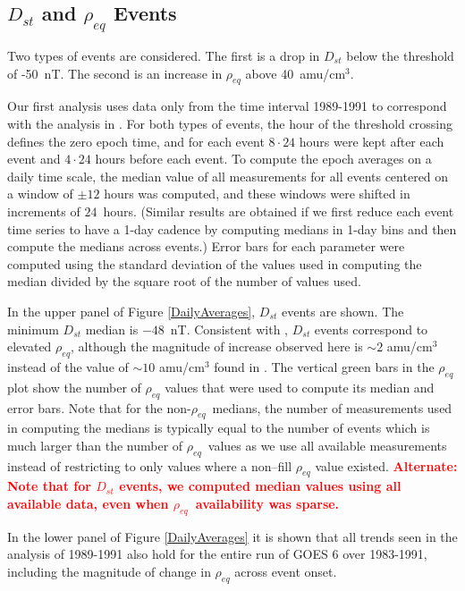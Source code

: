 \documentclass[10pt,twocolumn]{article}
\newcommand{\vinote}[1]{\textcolor{red}{\textbf{#1}}} %
\newcommand{\req}{\ensuremath{\rho_{eq}}}
\newcommand{\inote}[1]{\textcolor{blue}{\textbf{#1}}} %
\def\note#1\par{\textcolor{blue}{\textbf{#1}}\\}
\begin{document}
\subsection{$D_{st}$ and $\rho_{eq}$ Events}

Two types of events are considered. The first is a drop in $D_{st}$ below the threshold of -50~nT.  The second is an increase in $\rho_{eq}$ above 40~amu/cm$^3$.

Our first analysis uses data only from the time interval 1989-1991 to correspond with the analysis in \cite{Takahashi2010}. For both types of events, the hour of the threshold crossing defines the zero epoch time, and for each event $8\cdot24$ hours were kept after each event and $4\cdot24$ hours before each event.  To compute the epoch averages on a daily time scale, the median value of all measurements for all events centered on a window of $\pm 12$ hours was computed, and these windows were shifted in increments of $24$~hours. (Similar results are obtained if we first reduce each event time series to have a 1-day cadence by computing medians in 1-day bins and then compute the medians across events.)  Error bars for each parameter were computed using the standard deviation of the values used in computing the median divided by the square root of the number of values used.

In the upper panel of Figure \ref{DailyAverages}, $D_{st}$ events are shown.  The minimum $D_{st}$ median is $-48$~nT.  Consistent with \cite{Takahashi2010}, $D_{st}$ events correspond to elevated $\rho_{eq}$, although the magnitude of increase observed here is $\sim 2$ amu/cm$^3$ instead of the value of $\sim 10$ amu/cm$^3$ found in \cite{Takahashi2010}.  The vertical green bars in the $\rho_{eq}$ plot show the number of $\rho_{eq}$ values that were used to compute its median and error bars.  Note that for the non-\req\ medians, the number of measurements used in computing the medians is typically equal to the number of events which is much larger than the number of \req\ values as we use all available measurements instead of restricting to only values where a non--fill $\rho_{eq}$ value existed. \vinote{Alternate: Note that for $D_{st}$ events, we computed median values using all available data, even when \req\ availability was sparse.}

In the lower panel of Figure \ref{DailyAverages} it is shown that all trends seen in the analysis of 1989-1991 also hold for the entire run of GOES 6 over 1983-1991, including the magnitude of change in $\rho_{eq}$ across event onset.
\end{document}
